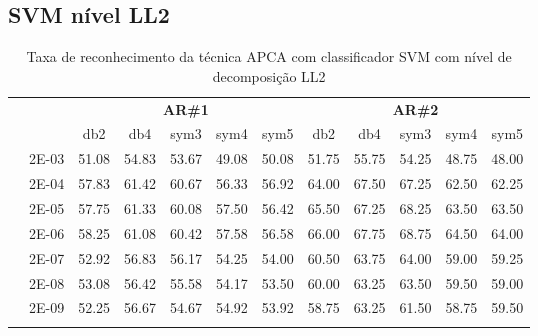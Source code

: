 \begin{table}[H]
\begin{tabular}{|c|c|c c c c c|c c c c c|}
	
\\\midrule
\end{tabular}

\end{table}

\subsection{SVM nível LL2}

\begin{table}[H]
	\centering
    \normalsize
	\caption{Taxa de reconhecimento da técnica APCA com classificador SVM com nível de decomposição LL2}
	\begin{tabular}{|c|c|c c c c c|c c c c c|}
\cline{3-12}
\multicolumn{2}{c|}{\multirow{2}{*}{}} & \multicolumn{5}{c|}{\textbf{AR\#1}}  & \multicolumn{5}{c|}{\textbf{AR\#2}} \\\cline{3-12}

\multicolumn{2}{c|}{}  & db2 & db4 & sym3 & sym4 & sym5 & db2 & db4& sym3 & sym4 & sym5 \\\hline
\multicolumn{1}{|c|}{ \multirow{6}{*}{\rotatebox[origin=c]{90}{\textbf{Gamma}}} }
&2E-03&	51.08&	54.83&	53.67&	49.08&	50.08&	51.75&	55.75&	54.25&	48.75&	48.00	\\\cline{2-12}
&2E-04&	57.83&	61.42&	60.67&	56.33&	56.92&	64.00&	67.50&	67.25&	62.50&	62.25	\\\cline{2-12}
&2E-05&	57.75&	61.33&	60.08&	57.50&	56.42&	65.50&	67.25&	68.25&	63.50&	63.50	\\\cline{2-12}
&2E-06&	58.25&	61.08&	60.42&	57.58&	56.58&	66.00&	67.75&	68.75&	64.50&	64.00	\\\cline{2-12}
&2E-07&	52.92&	56.83&	56.17&	54.25&	54.00&	60.50&	63.75&	64.00&	59.00&	59.25	\\\cline{2-12}
&2E-08&	53.08&	56.42&	55.58&	54.17&	53.50&	60.00&	63.25&	63.50&	59.50&	59.00	\\\cline{2-12}
&2E-09&	52.25&	56.67&	54.67&	54.92&	53.92&	58.75&	63.25&	61.50&	58.75&	59.50	

\\ \midrule
\multicolumn{12}{c}{}\\ 


\end{tabular}
\end{table}
